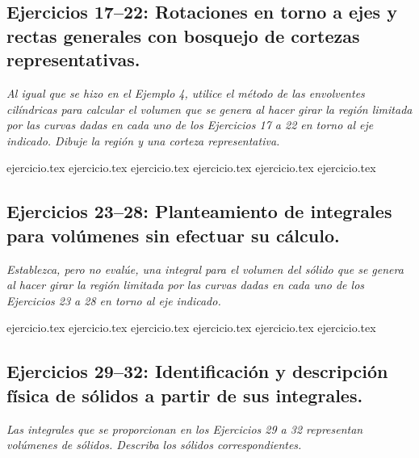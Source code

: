 \subsection*{Ejercicios 17--22: Rotaciones en torno a ejes y rectas generales con bosquejo de cortezas representativas.}

\noindent \textit{Al igual que se hizo en el Ejemplo 4, utilice el método de las envolventes cilíndricas para calcular el volumen que se genera al hacer girar la región limitada por las curvas dadas en cada uno de los Ejercicios 17 a 22 en torno al eje indicado. Dibuje la región y una corteza representativa.}

\begin{enumerate}
    \setcounter{enumi}{16}
    {ejercicio.tex}
    {ejercicio.tex}
    {ejercicio.tex}
    {ejercicio.tex}
    {ejercicio.tex}
    {ejercicio.tex}
\end{enumerate}

\subsection*{Ejercicios 23--28: Planteamiento de integrales para volúmenes sin efectuar su cálculo.}

\noindent \textit{Establezca, pero no evalúe, una integral para el volumen del sólido que se genera al hacer girar la región limitada por las curvas dadas en cada uno de los Ejercicios 23 a 28 en torno al eje indicado.}

\begin{enumerate}
    \setcounter{enumi}{22}
    {ejercicio.tex}
    {ejercicio.tex}
    {ejercicio.tex}
    {ejercicio.tex}
    {ejercicio.tex}
    {ejercicio.tex}
\end{enumerate}

\subsection*{Ejercicios 29--32: Identificación y descripción física de sólidos a partir de sus integrales.}

\noindent \textit{Las integrales que se proporcionan en los Ejercicios 29 a 32 representan volúmenes de sólidos. Describa los sólidos correspondientes.}

